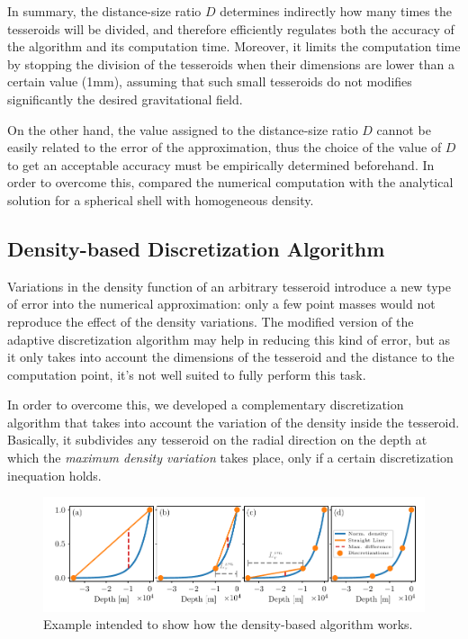 \documentclass[extra]{gji}
\begin{document}
In summary, the distance-size ratio $D$ determines indirectly how many 
times the tesseroids will be divided, and therefore efficiently 
regulates both the accuracy of the algorithm and its computation time.
Moreover, it limits the computation time by stopping the division of 
the tesseroids when their dimensions are lower than a certain value 
(1mm), assuming that such small tesseroids do not modifies 
significantly the desired gravitational field.

On the other hand, the value assigned to the distance-size ratio $D$ 
cannot be easily related to the error of the approximation, thus the 
choice of the value of $D$ to get an acceptable accuracy must be 
empirically determined beforehand.
In order to overcome this, \citet{Uieda2016} compared the numerical 
computation with the analytical solution for a spherical shell with 
homogeneous density.


\subsection{Density-based Discretization Algorithm}

Variations in the density function of an arbitrary tesseroid introduce 
a new type of error into the numerical approximation: only a few point 
masses would not reproduce the effect of the density variations.
The modified version of the adaptive discretization algorithm may help 
in reducing this kind of error, but as it only takes into account the 
dimensions of the tesseroid and the distance to the computation point, 
it's not well suited to fully perform this task.

In order to overcome this, we developed a complementary discretization 
algorithm that takes into account the variation of the density inside 
the tesseroid.
Basically, it subdivides any tesseroid on the radial direction on the 
depth at which the \emph{maximum density variation} takes place, only 
if a certain discretization inequation holds.

\begin{figure}
\centering
\includegraphics[width=\linewidth]
    {figures/density-based-discretization-algorithm.pdf}
\caption{
    Example intended to show how the density-based algorithm works.}
\label{fig:density-discretization-algorithm}
\end{figure}
\end{document}
